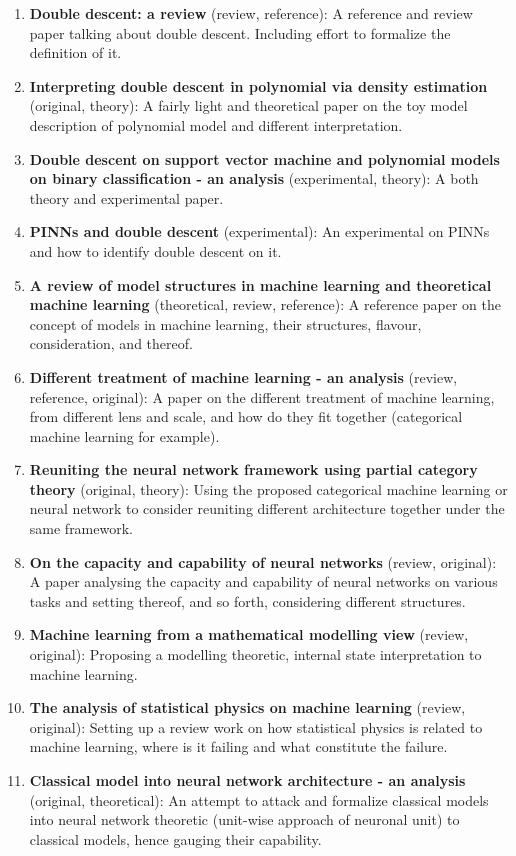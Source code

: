 \begin{enumerate}
    \item \textbf{Double descent: a review} (review, reference): A reference and review paper talking about double descent. Including effort to formalize the definition of it. 
    \item \textbf{Interpreting double descent in polynomial via density estimation} (original, theory): A fairly light and theoretical paper on the toy model description of polynomial model and different interpretation. 
    \item \textbf{Double descent on support vector machine and polynomial models on binary classification - an analysis} (experimental, theory): A both theory and experimental paper. 
    \item \textbf{PINNs and double descent} (experimental): An experimental on PINNs and how to identify double descent on it. 
    \item \textbf{A review of model structures in machine learning and theoretical machine learning} (theoretical, review, reference): A reference paper on the concept of models in machine learning, their structures, flavour, consideration, and thereof. 
    \item \textbf{Different treatment of machine learning - an analysis} (review, reference, original): A paper on the different treatment of machine learning, from different lens and scale, and how do they fit together (categorical machine learning for example). 
    \item \textbf{Reuniting the neural network framework using partial category theory} (original, theory): Using the proposed categorical machine learning or neural network to consider reuniting different architecture together under the same framework. 
    \item \textbf{On the capacity and capability of neural networks} (review, original): A paper analysing the capacity and capability of neural networks on various tasks and setting thereof, and so forth, considering different structures. 
    \item \textbf{Machine learning from a mathematical modelling view} (review, original): Proposing a modelling theoretic, internal state interpretation to machine learning. 
    \item \textbf{The analysis of statistical physics on machine learning} (review, original): Setting up a review work on how statistical physics is related to machine learning, where is it failing and what constitute the failure. 
    \item \textbf{Classical model into neural network architecture - an analysis} (original, theoretical): An attempt to attack and formalize classical models into neural network theoretic (unit-wise approach of neuronal unit) to classical models, hence gauging their capability. 

\end{enumerate}
